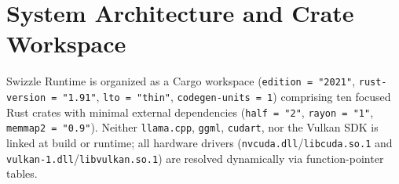 \documentclass[10pt,a4paper]{article}
\theoremstyle{swzstyle}
\newcommand{\code}[1]{\texttt{#1}}
\begin{document}
\section{System Architecture and Crate Workspace}

Swizzle Runtime is organized as a Cargo workspace (\code{edition = "2021"}, \code{rust-version = "1.91"}, \code{lto = "thin"}, \code{codegen-units = 1}) comprising ten focused Rust crates with minimal external dependencies (\code{half = "2"}, \code{rayon = "1"}, \code{memmap2 = "0.9"}). Neither \code{llama.cpp}, \code{ggml}, \code{cudart}, nor the Vulkan SDK is linked at build or runtime; all hardware drivers (\code{nvcuda.dll}/\code{libcuda.so.1} and \code{vulkan-1.dll}/\code{libvulkan.so.1}) are resolved dynamically via function-pointer tables.
\end{document}
